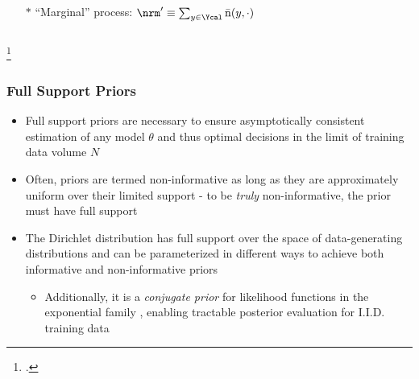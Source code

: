 \documentclass[aspectratio=169,usenames,dvipsnames]{beamer}
\DeclareMathOperator{\nbarrm}{\bar{\mathrm{n}}}
\begin{document}
\begin{frame}
\begin{columns}[c]
\begin{column}{.5\linewidth}
\vspace{1em}
\begin{itemize}
\item[$*$] ``Marginal'' process: $\nrm' \equiv \sum_{y \in \Ycal} \nbarrm(y,\cdot)$ 
\end{itemize}


\end{column}

\end{columns}

\footcitetext{bernardo}

\end{frame}





\begin{frame}
\frametitle{Full Support Priors}

\begin{itemize}
\item Full support priors are necessary to ensure \alert{asymptotically consistent} estimation of any model $\theta$ and thus optimal decisions in the limit of training data volume $N$
\vspace{0.5em}
\item Often, priors are termed non-informative as long as they are approximately uniform over their limited support - to be \emph{truly} non-informative, the prior must have full support
\vspace{0.5em}
\item The \alert{Dirichlet distribution} has full support over the space of data-generating distributions and can be parameterized in different ways to achieve both informative and non-informative priors
	\vspace{0.25em}
	\begin{itemize}
	\item Additionally, it is a \emph{conjugate prior} for likelihood functions in the exponential family , enabling tractable posterior evaluation for I.I.D. training data
	\end{itemize}
\end{itemize}

\end{frame}
\end{document}
